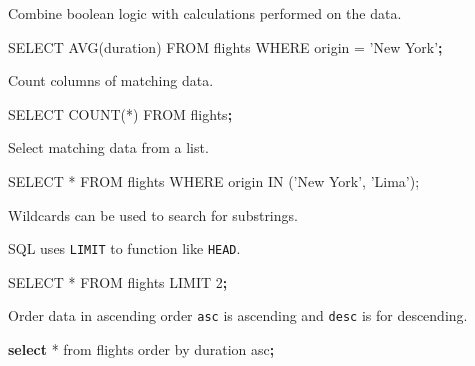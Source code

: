 \documentclass[]{book}
\newenvironment{Shaded}{\begin{snugshade}}{\end{snugshade}}
\newcommand{\KeywordTok}[1]{\textcolor[rgb]{0.13,0.29,0.53}{\textbf{#1}}}
\newcommand{\StringTok}[1]{\textcolor[rgb]{0.31,0.60,0.02}{#1}}
\newcommand{\ExtensionTok}[1]{#1}
\newcommand{\NormalTok}[1]{#1}
\begin{document}
Combine boolean logic with calculations performed on the data.

\begin{Shaded}
\begin{Highlighting}[]
\ExtensionTok{SELECT}\NormalTok{ AVG(duration) }\ExtensionTok{FROM}\NormalTok{ flights WHERE origin = }\StringTok{'New York'}\KeywordTok{;}
\end{Highlighting}
\end{Shaded}

Count columns of matching data.

\begin{Shaded}
\begin{Highlighting}[]
\ExtensionTok{SELECT}\NormalTok{ COUNT(*) }\ExtensionTok{FROM}\NormalTok{ flights}\KeywordTok{;}
\end{Highlighting}
\end{Shaded}

Select matching data from a list.

\begin{Shaded}
\begin{Highlighting}[]
\ExtensionTok{SELECT}\NormalTok{ * FROM flights WHERE origin IN (}\StringTok{'New York'}\NormalTok{, }\StringTok{'Lima'}\NormalTok{);}
\end{Highlighting}
\end{Shaded}

Wildcards can be used to search for substrings.

\begin{Shaded}
\end{Shaded}

SQL uses \texttt{LIMIT} to function like \texttt{HEAD}.

\begin{Shaded}
\begin{Highlighting}[]
\ExtensionTok{SELECT}\NormalTok{ * FROM flights LIMIT 2}\KeywordTok{;}
\end{Highlighting}
\end{Shaded}

Order data in ascending order \texttt{asc} is ascending and
\texttt{desc} is for descending.

\begin{Shaded}
\begin{Highlighting}[]
\KeywordTok{select} \ExtensionTok{*}\NormalTok{ from flights order by duration asc}\KeywordTok{;}
\end{Highlighting}
\end{Shaded}
\end{document}
